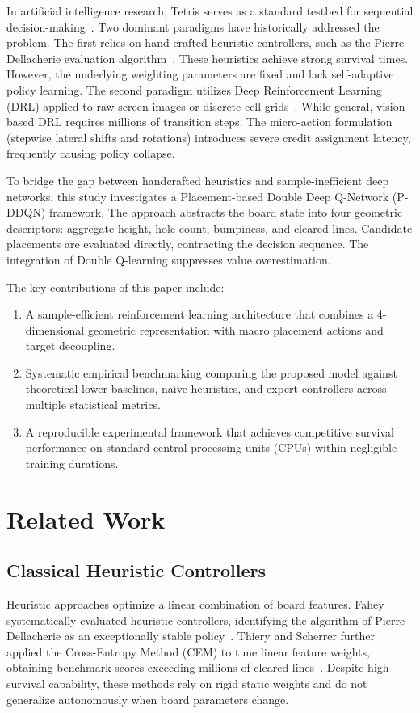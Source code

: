 \documentclass[runningheads]{llncs}
\begin{document}
In artificial intelligence research, Tetris serves as a standard testbed for sequential decision-making~\cite{bertsekas1996neuro,lagoudakis2002least}. Two dominant paradigms have historically addressed the problem. The first relies on hand-crafted heuristic controllers, such as the Pierre Dellacherie evaluation algorithm~\cite{fahey2003tetris}. These heuristics achieve strong survival times. However, the underlying weighting parameters are fixed and lack self-adaptive policy learning. The second paradigm utilizes Deep Reinforcement Learning (DRL) applied to raw screen images or discrete cell grids~\cite{mnih2015human}. While general, vision-based DRL requires millions of transition steps. The micro-action formulation (stepwise lateral shifts and rotations) introduces severe credit assignment latency, frequently causing policy collapse.

To bridge the gap between handcrafted heuristics and sample-inefficient deep networks, this study investigates a Placement-based Double Deep Q-Network (P-DDQN) framework. The approach abstracts the board state into four geometric descriptors: aggregate height, hole count, bumpiness, and cleared lines. Candidate placements are evaluated directly, contracting the decision sequence. The integration of Double Q-learning suppresses value overestimation.

The key contributions of this paper include:
\begin{enumerate}
    \item A sample-efficient reinforcement learning architecture that combines a 4-dimensional geometric representation with macro placement actions and target decoupling.
    \item Systematic empirical benchmarking comparing the proposed model against theoretical lower baselines, naive heuristics, and expert controllers across multiple statistical metrics.
    \item A reproducible experimental framework that achieves competitive survival performance on standard central processing units (CPUs) within negligible training durations.
\end{enumerate}

\section{Related Work}
\subsection{Classical Heuristic Controllers}
Heuristic approaches optimize a linear combination of board features. Fahey systematically evaluated heuristic controllers, identifying the algorithm of Pierre Dellacherie as an exceptionally stable policy~\cite{fahey2003tetris}. Thiery and Scherrer further applied the Cross-Entropy Method (CEM) to tune linear feature weights, obtaining benchmark scores exceeding millions of cleared lines~\cite{thiery2009building}. Despite high survival capability, these methods rely on rigid static weights and do not generalize autonomously when board parameters change.
\end{document}
